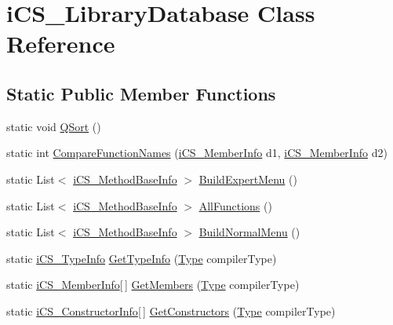 \hypertarget{classi_c_s___library_database}{\section{i\+C\+S\+\_\+\+Library\+Database Class Reference}
\label{classi_c_s___library_database}
}
\subsection*{Static Public Member Functions}
\begin{DoxyCompactItemize}
\item 
static void \hyperlink{classi_c_s___library_database_a4b77ef77415da5232e2276aab16ec248}{Q\+Sort} ()
\item 
static int \hyperlink{classi_c_s___library_database_ac552f35350df6c4faf68532eb834872c}{Compare\+Function\+Names} (\hyperlink{classi_c_s___member_info}{i\+C\+S\+\_\+\+Member\+Info} d1, \hyperlink{classi_c_s___member_info}{i\+C\+S\+\_\+\+Member\+Info} d2)
\item 
static List$<$ \hyperlink{classi_c_s___method_base_info}{i\+C\+S\+\_\+\+Method\+Base\+Info} $>$ \hyperlink{classi_c_s___library_database_a21a8f3de79686281d7a46b0b6da0fe48}{Build\+Expert\+Menu} ()
\item 
static List$<$ \hyperlink{classi_c_s___method_base_info}{i\+C\+S\+\_\+\+Method\+Base\+Info} $>$ \hyperlink{classi_c_s___library_database_a6838498925401fd9cb2d176215c9aacd}{All\+Functions} ()
\item 
static List$<$ \hyperlink{classi_c_s___method_base_info}{i\+C\+S\+\_\+\+Method\+Base\+Info} $>$ \hyperlink{classi_c_s___library_database_aae49a171e534767aa54df7f4022325ff}{Build\+Normal\+Menu} ()
\item 
static \hyperlink{classi_c_s___type_info}{i\+C\+S\+\_\+\+Type\+Info} \hyperlink{classi_c_s___library_database_a1a3a04fb91f121e4b4441259e203b43c}{Get\+Type\+Info} (\hyperlink{i_c_s___object_type_enum_8cs_ae6c3dd6d8597380b56d94908eb431547aa1fa27779242b4902f7ae3bdd5c6d508}{Type} compiler\+Type)
\item 
static \hyperlink{classi_c_s___member_info}{i\+C\+S\+\_\+\+Member\+Info}\mbox{[}$\,$\mbox{]} \hyperlink{classi_c_s___library_database_ab58efcaec6806ec8f9bdeb884ef8c6d2}{Get\+Members} (\hyperlink{i_c_s___object_type_enum_8cs_ae6c3dd6d8597380b56d94908eb431547aa1fa27779242b4902f7ae3bdd5c6d508}{Type} compiler\+Type)
\item 
static \hyperlink{classi_c_s___constructor_info}{i\+C\+S\+\_\+\+Constructor\+Info}\mbox{[}$\,$\mbox{]} \hyperlink{classi_c_s___library_database_a8c4f14835ef4d9b0fb8329abdd83b92b}{Get\+Constructors} (\hyperlink{i_c_s___object_type_enum_8cs_ae6c3dd6d8597380b56d94908eb431547aa1fa27779242b4902f7ae3bdd5c6d508}{Type} compiler\+Type)

\end{DoxyCompactItemize}
